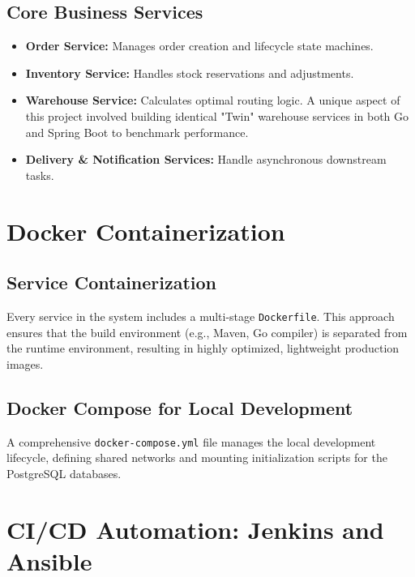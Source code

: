 \documentclass[12pt,a4paper]{report}
\begin{document}
\section{Core Business Services}
\begin{itemize}
    \item \textbf{Order Service:} Manages order creation and lifecycle state machines.
    \item \textbf{Inventory Service:} Handles stock reservations and adjustments.
    \item \textbf{Warehouse Service:} Calculates optimal routing logic. A unique aspect of this project involved building identical "Twin" warehouse services in both Go and Spring Boot to benchmark performance.
    \item \textbf{Delivery \& Notification Services:} Handle asynchronous downstream tasks.
\end{itemize}

\chapter{Docker Containerization}

\section{Service Containerization}
Every service in the system includes a multi-stage \texttt{Dockerfile}. This approach ensures that the build environment (e.g., Maven, Go compiler) is separated from the runtime environment, resulting in highly optimized, lightweight production images.

\section{Docker Compose for Local Development}
A comprehensive \texttt{docker-compose.yml} file manages the local development lifecycle, defining shared networks and mounting initialization scripts for the PostgreSQL databases.

\chapter{CI/CD Automation: Jenkins and Ansible}
\end{document}
